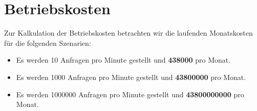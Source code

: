 \documentclass[a4paper, 12pt]{scrreprt}
\renewcommand\_{\textunderscore\allowbreak}
\begin{document}
\section{Betriebskosten}
Zur Kalkulation der Betriebskosten betrachten wir die laufenden Monatskosten für die folgenden Szenarien:\\
\begin{itemize}
\item Es werden 10 Anfragen pro Minute gestellt und \textbf{438000} pro Monat.
\item Es werden 1000 Anfragen pro Minute gestellt und \textbf{43800000} pro Monat.
\item Es werden 1000000 Anfragen pro Minute gestellt und \textbf{43800000000} pro Monat.
\end{itemize}
\end{document}
